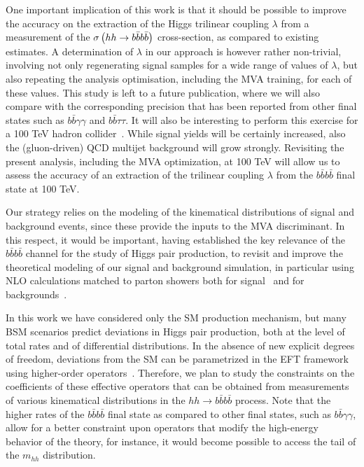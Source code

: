 One important implication of this work is that it should
be possible to improve  the accuracy on the extraction of
the Higgs trilinear coupling $\lambda$ from
a measurement of the
$\sigma\left( hh\to b\bar{b}b\bar{b}\right)$ cross-section, as compared
to existing estimates.
%
A determination of $\lambda$ in our approach is however
rather
non-trivial, involving
 not only regenerating signal samples
 for a wide range of values of  $\lambda$, but also
 repeating the analysis
optimisation, including the MVA training, for each
of these values.
%
This study is left to a future
publication, where we will also
compare with the corresponding  precision 
that has been reported from other final states such as
 $b\bar{b}\gamma\gamma$
and $b\bar{b}\tau\tau$.
%
It will also be  interesting to perform
this exercise for a 100 TeV hadron collider~\cite{Barr:2014sga,
  Azatov:2015oxa,Papaefstathiou:2015iba,
  Arkani-Hamed:2015vfh}.
%
While signal yields will be certainly increased, also the (gluon-driven) QCD
multijet background will grow strongly.
%
Revisiting
the present analysis, including the MVA optimization,
at 100 TeV will allow us
to assess the accuracy of an extraction of the trilinear
coupling $\lambda$ from the $b\bar{b}b\bar{b}$ final state
at 100 TeV.


Our strategy relies on the modeling of the kinematical
distributions of signal and background events, since these provide
the inputs to the MVA discriminant.
%
In this respect, it would be important, having established the key
relevance of the $b\bar{b}b\bar{b}$ channel for the study of
Higgs pair production, to revisit and improve the
theoretical modeling of our signal and background simulation,
in particular using NLO calculations matched to
parton showers both for signal~\cite{Frederix:2014hta,Maierhofer:2013sha}
and for backgrounds~\cite{Alwall:2014hca,Gleisberg:2008ta}.
%

In this work we have considered only the SM production mechanism,
but many BSM scenarios predict deviations
in Higgs pair production, both at the level of total rates
and of
differential distributions.
%
In the absence of new explicit degrees of freedom,
deviations from the SM can be parametrized in
the EFT framework using higher-order
operators~\cite{Azatov:2015oxa,Goertz:2014qta}.
%
Therefore, we plan to study the constraints
on the coefficients of these effective
operators that can be obtained from measurements
of various kinematical distributions
in the $hh\to b\bar{b}b\bar{b}$ process.
%
Note that the higher rates of the $b\bar{b}b\bar{b}$ final state as compared to
other final states, such as
$b\bar{b}\gamma\gamma$, allow for a better constraint upon operators
that modify the high-energy behavior
of the theory, for instance,
it would become possible
to access the tail of the $m_{hh}$ distribution.


